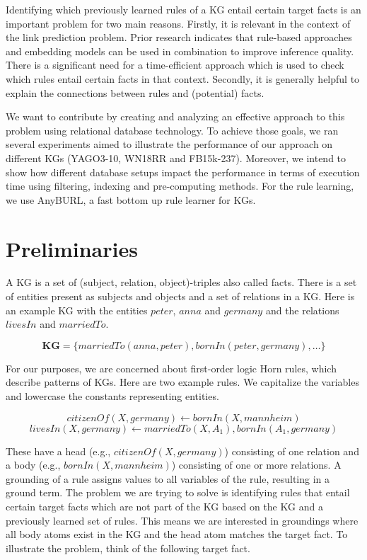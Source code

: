 \documentclass[english]{lni}
\begin{document}
Identifying which previously learned rules of a KG entail certain target facts is an important problem for two main reasons. Firstly, it is relevant in the context of the link prediction problem. Prior research indicates that rule-based approaches and embedding models can be used in combination to improve inference quality.\cite{RuleEmbeddingCombination1}\cite{RuleEmbeddingCombination2} There is a significant need for a time-efficient approach which is used to check which rules entail certain facts in that context. Secondly, it is generally helpful to explain the connections between rules and (potential) facts.


We want to contribute by creating and analyzing an effective approach to this problem using relational database technology. To achieve those goals, we ran several experiments aimed to illustrate the performance of our approach on different KGs (YAGO3-10, WN18RR and FB15k-237). Moreover, we intend to show how different database setups impact the performance in terms of execution time using filtering, indexing and pre-computing methods. For the rule learning, we use AnyBURL, a fast bottom up rule learner for KGs.\cite{AnyBURL19}

\section{Preliminaries} 
A KG is a set of (subject, relation, object)-triples also called facts. There is a set of entities present as subjects and objects and a set of relations in a KG. Here is an example KG with the entities \(peter\), \(anna\) and \(germany\) and the relations \(livesIn\) and \(marriedTo\).

\[\textbf{KG} = \{marriedTo(anna, peter), bornIn(peter, germany), …\}\]

For our purposes, we are concerned about first-order logic Horn rules, which describe patterns of KGs. Here are two example rules. We capitalize the variables and lowercase the constants representing entities.

\begin{equation} \label{eq:rule_1}
citizenOf(X, germany) \leftarrow bornIn(X, mannheim) 
\end{equation} \label{eq:rule_2}
\begin{equation}
livesIn(X, germany) \leftarrow marriedTo(X, A_1), bornIn(A_1, germany)
\end{equation}

These have a head (e.g., \(citizenOf(X, germany)\)) consisting of one relation and a body (e.g., \(bornIn(X, mannheim)\)) consisting of one or more relations. A grounding of a rule assigns values to all variables of the rule, resulting in a ground term. The problem we are trying to solve is identifying rules that entail certain target facts which are not part of the KG based on the KG and a previously learned set of rules. This means we are interested in groundings where all body atoms exist in the KG and the head atom matches the target fact. To illustrate the problem, think of the following target fact.
\end{document}
